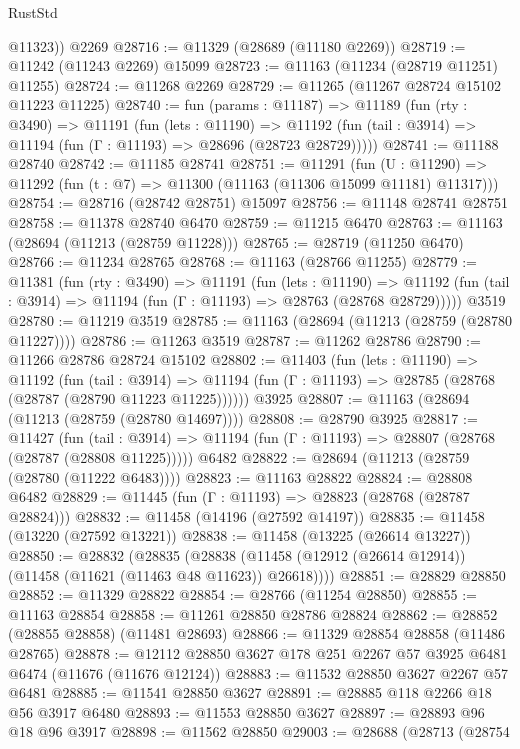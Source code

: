 \begin{lexlean}{RustStd}
\begin{coremodule}
        @11323))
    @2269
@28716 := @11329 (@28689 (@11180 @2269))
@28719 := @11242 (@11243 @2269) @15099
@28723 := @11163 (@11234 (@28719 @11251) @11255)
@28724 := @11268 @2269
@28729 := @11265 (@11267 @28724 @15102 @11223 @11225)
@28740 := fun (params : @11187) =>
  @11189
    (fun (rty : @3490) =>
    @11191
      (fun (lets : @11190) =>
      @11192 (fun (tail : @3914) => @11194 (fun (Γ : @11193) => @28696 (@28723 @28729)))))
@28741 := @11188 @28740
@28742 := @11185 @28741
@28751 := @11291
    (fun (U : @11290) => @11292 (fun (t : @7) => @11300 (@11163 (@11306 @15099 @11181) @11317)))
@28754 := @28716 (@28742 @28751) @15097
@28756 := @11148 @28741 @28751
@28758 := @11378 @28740 @6470
@28759 := @11215 @6470
@28763 := @11163 (@28694 (@11213 (@28759 @11228)))
@28765 := @28719 (@11250 @6470)
@28766 := @11234 @28765
@28768 := @11163 (@28766 @11255)
@28779 := @11381
    (fun (rty : @3490) =>
    @11191
      (fun (lets : @11190) =>
      @11192 (fun (tail : @3914) => @11194 (fun (Γ : @11193) => @28763 (@28768 @28729)))))
    @3519
@28780 := @11219 @3519
@28785 := @11163 (@28694 (@11213 (@28759 (@28780 @11227))))
@28786 := @11263 @3519
@28787 := @11262 @28786
@28790 := @11266 @28786 @28724 @15102
@28802 := @11403
    (fun (lets : @11190) =>
    @11192
      (fun (tail : @3914) =>
      @11194 (fun (Γ : @11193) => @28785 (@28768 (@28787 (@28790 @11223 @11225))))))
    @3925
@28807 := @11163 (@28694 (@11213 (@28759 (@28780 @14697))))
@28808 := @28790 @3925
@28817 := @11427
    (fun (tail : @3914) => @11194 (fun (Γ : @11193) => @28807 (@28768 (@28787 (@28808 @11225)))))
    @6482
@28822 := @28694 (@11213 (@28759 (@28780 (@11222 @6483))))
@28823 := @11163 @28822
@28824 := @28808 @6482
@28829 := @11445 (fun (Γ : @11193) => @28823 (@28768 (@28787 @28824)))
@28832 := @11458 (@14196 (@27592 @14197))
@28835 := @11458 (@13220 (@27592 @13221))
@28838 := @11458 (@13225 (@26614 @13227))
@28850 := @28832
    (@28835 (@28838 (@11458 (@12912 (@26614 @12914)) (@11458 (@11621 (@11463 @48 @11623)) @26618))))
@28851 := @28829 @28850
@28852 := @11329 @28822
@28854 := @28766 (@11254 @28850)
@28855 := @11163 @28854
@28858 := @11261 @28850 @28786 @28824
@28862 := @28852 (@28855 @28858) (@11481 @28693)
@28866 := @11329 @28854 @28858 (@11486 @28765)
@28878 := @12112 @28850 @3627 @178 @251 @2267 @57 @3925 @6481 @6474 (@11676 (@11676 @12124))
@28883 := @11532 @28850 @3627 @2267 @57 @6481
@28885 := @11541 @28850 @3627
@28891 := @28885 @118 @2266 @18 @56 @3917 @6480
@28893 := @11553 @28850 @3627
@28897 := @28893 @96 @18 @96 @3917
@28898 := @11562 @28850
@29003 := @28688
    (@28713
      (@28754

\end{coremodule}
\end{lexlean}
